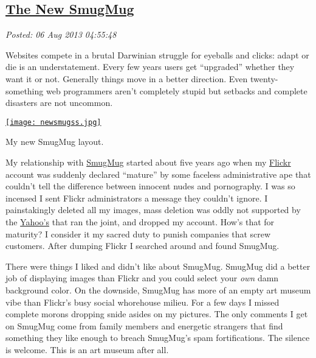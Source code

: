 %

\subsection*{\href{https://bakerjd99.wordpress.com/2013/08/05/the-new-smugmug/}{The New SmugMug}}


\noindent\emph{Posted: 06 Aug 2013 04:55:48}
\vspace{6pt}

Websites compete in a brutal Darwinian struggle for eyeballs and clicks:
adapt or die is an understatement. Every few years users get
``upgraded'' whether they want it or not. Generally things move in a
better direction. Even twenty-something web programmers aren't
completely stupid but setbacks and complete disasters are not uncommon.



\captionsetup[figure]{labelformat=empty}
\captionsetup[floatingfigure]{labelformat=empty}

\begin{floatingfigure}[r]{0.37\textwidth}
\centering
\href{http://conceptcontrol.smugmug.com/}{\texttt{[image: newsmugss.jpg]}}
\caption{My new SmugMug layout.}
\label{fig:4126X0}
\end{floatingfigure}


My relationship with \href{http://www.smugmug.com/}{SmugMug} started
about five years ago when my \href{http://www.flickr.com/}{Flickr}
account was suddenly declared ``mature'' by some faceless administrative
ape that couldn't tell the difference between innocent nudes and
pornography. I was so incensed I sent Flickr administrators a message
they couldn't ignore. I painstakingly deleted all my images, mass
deletion was oddly not supported by the
\href{http://www.yahoo.com/}{Yahoo's} that ran the joint, and dropped my
account. How's that for maturity? I consider it my sacred duty to punish
companies that screw customers. After dumping Flickr I searched around
and found SmugMug.

There were things I liked and didn't like about SmugMug. SmugMug did a
better job of displaying images than Flickr and you could select your
\emph{own} damn background color. On the downside, SmugMug has more of
an empty art museum vibe than Flickr's busy social whorehouse milieu.
For a few days I missed complete morons dropping snide asides on my
pictures. The only comments I get on SmugMug come from family members
and energetic strangers that find something they like enough to breach
SmugMug's spam fortifications. The silence is welcome. This is an art
museum after all.

